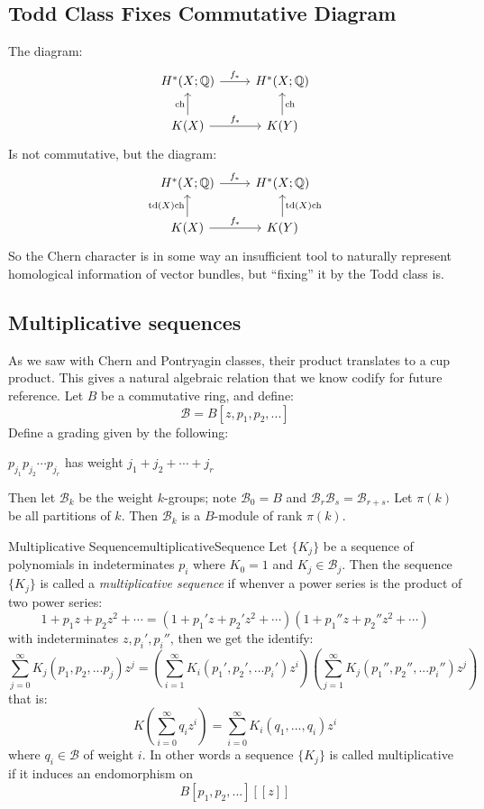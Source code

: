 \documentclass{book}
\newcommand{\Q}{{\mathbb{Q}}}
\newcommand{\CB}{{\mathcal{B}}}
\newcommand{\ch}{{\operatorname{ch}}}
\newcommand{\td}{{\operatorname{td}}}
\begin{document}
\subsection{Todd Class Fixes Commutative Diagram}

The diagram:
\[
\begin{tikzcd}
H^*(X;\Q) \arrow[r, "f_*"]             & H^*(X;\Q)              \\
K(X) \arrow[r, "f_*"] \arrow[u, "\ch"] & K(Y) \arrow[u, "\ch"']
\end{tikzcd}
\]
Is not commutative, but the diagram:
\[
\begin{tikzcd}
H^*(X;\Q) \arrow[r, "f_*"]                   & H^*(X;\Q)                    \\
K(X) \arrow[r, "f_*"] \arrow[u, "\td(X)\ch"] & K(Y) \arrow[u, "\td(X)\ch"']
\end{tikzcd}
\]
So the Chern character is in some way an insufficient tool to naturally represent homological information of
vector bundles, but ``fixing'' it by the Todd class is.

\subsection{Multiplicative sequences}

As we saw with Chern and Pontryagin classes, their product translates to a cup product. This gives a natural
algebraic relation that we know codify for future reference.
Let $B$ be a commutative ring, and define:
\[
  \CB = B[z, p_1, p_2, ...]
\]
Define a grading given by the following:
\begin{center}
  $p_{j_1}p_{j_2}\cdots p_{j_r}$ has weight $j_1 + j_2 + \cdots + j_r$
\end{center}
Then let $\CB_k$ be the weight $k$-groups; note $\CB_0 = B$ and $\CB_r\CB_s = \CB_{r+s}$. Let $\pi(k)$ be all
partitions of $k$. Then $\CB_k$ is a $B$-module of rank $\pi(k)$.

\begin{defn}{Multiplicative Sequence}{multiplicativeSequence}
  Let $\{K_j\}$ be a sequence of polynomials in indeterminates $p_i$ where $K_0 = 1$ and $K_j \in \CB_j$. Then
  the sequence $\{K_j\}$ is called a \emph{multiplicative sequence} if whenver a power series is the product
  of two power series:
  \[
    1 + p_1z + p_2z^2  +\cdots = (1 + p_1'z + p_2'z^2  +\cdots)(1 + p_1''z + p_2''z^2  +\cdots)
  \]
  with indeterminates $z, p_i', p_i''$, then we get the identify:
  \[
    \sum_{j=0}^\infty K_j(p_1, p_2, ... p_j)z^j = \left(\sum_{i=1}^\infty K_i(p_1', p_2', ...
    p_i')z^i\right)\left(\sum_{j=1}^\infty K_j(p_1'', p_2'', ... p_i'')z^j\right)
  \]
  that is:
  \[
    K \left(\sum_{i=0}^\infty q_iz^i\right) = \sum_{i=0}^\infty K_i(q_1, ..., q_i)z^i
  \]
  where $q_i \in \CB$ of weight $i$. In other words a sequence $\{K_j\}$ is called multiplicative if it induces an endomorphism on
  \[
    B[p_1, p_2, ...]\left[[z]\right]
  \]
\end{defn}
\end{document}
